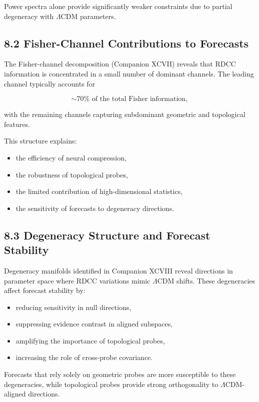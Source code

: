 \documentclass[11pt,a4paper]{article}
\begin{document}
Power spectra alone provide significantly weaker constraints due to partial 
degeneracy with $\Lambda$CDM parameters.

\subsection*{8.2 Fisher-Channel Contributions to Forecasts}

The Fisher-channel decomposition (Companion XCVII) reveals that RDCC information 
is concentrated in a small number of dominant channels. The leading channel 
typically accounts for


\[
    \sim 70\% \text{ of the total Fisher information},
\]


with the remaining channels capturing subdominant geometric and topological 
features.

This structure explains:

\begin{itemize}
    \item the efficiency of neural compression,
    \item the robustness of topological probes,
    \item the limited contribution of high-dimensional statistics,
    \item the sensitivity of forecasts to degeneracy directions.
\end{itemize}

\subsection*{8.3 Degeneracy Structure and Forecast Stability}

Degeneracy manifolds identified in Companion XCVIII reveal directions in 
parameter space where RDCC variations mimic $\Lambda$CDM shifts. These 
degeneracies affect forecast stability by:

\begin{itemize}
    \item reducing sensitivity in null directions,
    \item suppressing evidence contrast in aligned subspaces,
    \item amplifying the importance of topological probes,
    \item increasing the role of cross-probe covariance.
\end{itemize}

Forecasts that rely solely on geometric probes are more susceptible to these 
degeneracies, while topological probes provide strong orthogonality to 
$\Lambda$CDM-aligned directions.
\end{document}
